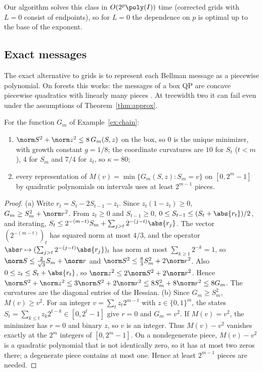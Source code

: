 Our algorithm solves this class in $O(2^p\poly(I))$ time (corrected grids with
$L=0$ consist of endpoints), so for $L=0$ the dependence on $p$ is optimal up
to the base of the exponent.

\subsection{Exact messages}
The exact alternative to grids is to represent each Bellman message as a
piecewise polynomial. On forests this works: the messages of a box QP are
concave piecewise quadratics with linearly many pieces
\cite{DelPiaKhajavirad2026}. At treewidth two it can fail even under the
assumptions of Theorem~\ref{thm:approx}.

\begin{proposition}\label{prop:chain}
For the function $G_m$ of Example~\ref{ex:chain}:
\begin{enumerate}[label=(\alph*)]
\item $\norm S^2+\norm z^2\le8\,G_m(S,z)$ on the box, so $0$ is the unique
minimizer, with growth constant $g=1/8$; the coordinate curvatures are
$10$ for $S_t$ ($t<m$), $4$ for $S_m$ and $7/4$ for $z_t$, so $\kappa=80$;
\item every representation of
$M(v)=\min\{G_m(S,z):S_m=v\}$ on $[0,2^m-1]$ by quadratic polynomials on
intervals uses at least $2^{m-1}$ pieces.
\end{enumerate}
\end{proposition}

\begin{proof}
(a) Write $r_t=S_t-2S_{t-1}-z_t$. Since $z_t(1-z_t)\ge0$,
$G_m\ge S_m^2+\norm r^2$. From $z_t\ge0$ and $S_{t-1}\ge0$,
$0\le S_{t-1}\le(S_t+\abs{r_t})/2$, and iterating,
$S_t\le2^{-(m-t)}S_m+\sum_{j>t}2^{-(j-t)}\abs{r_j}$. The vector
$(2^{-(m-t)})_t$ has squared norm at most $4/3$, and the operator
$\abs r\mapsto(\sum_{j>t}2^{-(j-t)}\abs{r_j})_t$ has norm at most
$\sum_{k\ge1}2^{-k}=1$, so $\norm S\le\frac2{\sqrt3}S_m+\norm r$ and
$\norm S^2\le\frac83S_m^2+2\norm r^2$. Also
$0\le z_t\le S_t+\abs{r_t}$, so $\norm z^2\le2\norm S^2+2\norm r^2$. Hence
$\norm S^2+\norm z^2\le3\norm S^2+2\norm r^2\le8S_m^2+8\norm r^2\le8G_m$.
The curvatures are the diagonal entries of the Hessian.
(b) Since $G_m\ge S_m^2$, $M(v)\ge v^2$. For an integer
$v=\sum_tz_t2^{m-t}$ with $z\in\{0,1\}^m$, the states
$S_t=\sum_{k\le t}z_k2^{t-k}\in[0,2^t-1]$ give $r=0$ and $G_m=v^2$. If
$M(v)=v^2$, the minimizer has $r=0$ and binary $z$, so $v$ is an integer.
Thus $M(v)-v^2$ vanishes exactly at the $2^m$ integers of $[0,2^m-1]$. On a
nondegenerate piece, $M(v)-v^2$ is a quadratic polynomial that is not
identically zero, so it has at most two zeros there; a degenerate piece
contains at most one. Hence at least $2^{m-1}$ pieces are needed.
\end{proof}

